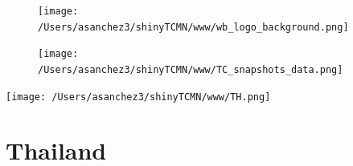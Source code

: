 \documentclass{article}\usepackage[]{graphicx}\usepackage[]{color}
\begin{document}
%

\begin{figure}
  \vspace{-3ex} %
  \hspace{-7ex} %
  \texttt{[image: /Users/asanchez3/shinyTCMN/www/wb\_logo\_background.png]}
\end{figure}
\begin{figure}
  \begin{minipage}[t]{0.99\textwidth} %
      \vspace{-30ex}
      \hspace{-2ex}
      \raggedright{\texttt{[image: /Users/asanchez3/shinyTCMN/www/TC\_snapshots\_data.png]}}
  \end{minipage}
\end{figure}
%
\begin{minipage}[t]{0.99\textwidth} %
  \vspace{-1.5cm}
  \begin{minipage}[c]{0.36\textwidth} 
    \begin{minipage}[c]{0.28\textwidth} %
      \texttt{[image: /Users/asanchez3/shinyTCMN/www/TH.png]}
    \end{minipage}
    \begin{minipage}[c]{0.70\textwidth} %
      \section*{\color{blue!40!black}Thailand}
    \end{minipage}
  \end{minipage}
  \begin{minipage}[c]{0.63\textwidth} %
    \centering
  \end{minipage}  
\end{minipage} %
\end{document}
